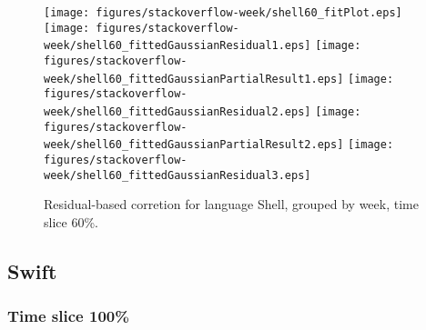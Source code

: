 \begin{figure}[t]
\centering
{}
{\texttt{[image: figures/stackoverflow-week/shell60\_fitPlot.eps]}}
{\texttt{[image: figures/stackoverflow-week/shell60\_fittedGaussianResidual1.eps]}}
{\texttt{[image: figures/stackoverflow-week/shell60\_fittedGaussianPartialResult1.eps]}}
{\texttt{[image: figures/stackoverflow-week/shell60\_fittedGaussianResidual2.eps]}}
{\texttt{[image: figures/stackoverflow-week/shell60\_fittedGaussianPartialResult2.eps]}}
{\texttt{[image: figures/stackoverflow-week/shell60\_fittedGaussianResidual3.eps]}}
\caption{Residual-based corretion for language Shell, grouped by week, time slice 60\%.}
\end{figure}


\FloatBarrier


\subsection{Swift}

\subsubsection{Time slice 100\%}

